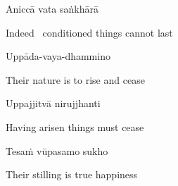 \suttaRef{[Dhp 41]}

Aniccā vata saṅkhārā

\begin{english}
  Indeed \breathmark\ conditioned things cannot last
\end{english}

Uppāda-vaya-dhammino

\begin{english}
  Their nature is to rise and cease
\end{english}

Uppajjitvā nirujjhanti

\begin{english}
  Having arisen things must cease
\end{english}

Tesaṁ vūpasamo sukho

\begin{english}
  Their stilling is true happiness
\end{english}

\suttaRef{[Trad]}

